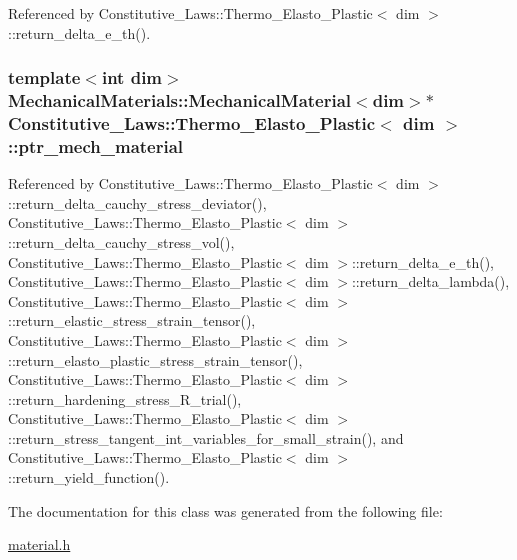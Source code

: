 Referenced by Constitutive\+\_\+\+Laws\+::\+Thermo\+\_\+\+Elasto\+\_\+\+Plastic$<$ dim $>$\+::return\+\_\+delta\+\_\+e\+\_\+th().

\subsubsection[{\texorpdfstring{ptr\+\_\+mech\+\_\+material}{ptr_mech_material}}]{\setlength{\rightskip}{0pt plus 5cm}template$<$int dim$>$ Mechanical\+Materials\+::\+Mechanical\+Material$<$dim$>$$\ast$ {\bf Constitutive\+\_\+\+Laws\+::\+Thermo\+\_\+\+Elasto\+\_\+\+Plastic}$<$ dim $>$\+::ptr\+\_\+mech\+\_\+material\hspace{0.3cm}{\ttfamily [private]}}\hypertarget{classConstitutive__Laws_1_1Thermo__Elasto__Plastic_a5a59fd71829d58859a122fe74628a9e4}{}\label{classConstitutive__Laws_1_1Thermo__Elasto__Plastic_a5a59fd71829d58859a122fe74628a9e4}


Referenced by Constitutive\+\_\+\+Laws\+::\+Thermo\+\_\+\+Elasto\+\_\+\+Plastic$<$ dim $>$\+::return\+\_\+delta\+\_\+cauchy\+\_\+stress\+\_\+deviator(), Constitutive\+\_\+\+Laws\+::\+Thermo\+\_\+\+Elasto\+\_\+\+Plastic$<$ dim $>$\+::return\+\_\+delta\+\_\+cauchy\+\_\+stress\+\_\+vol(), Constitutive\+\_\+\+Laws\+::\+Thermo\+\_\+\+Elasto\+\_\+\+Plastic$<$ dim $>$\+::return\+\_\+delta\+\_\+e\+\_\+th(), Constitutive\+\_\+\+Laws\+::\+Thermo\+\_\+\+Elasto\+\_\+\+Plastic$<$ dim $>$\+::return\+\_\+delta\+\_\+lambda(), Constitutive\+\_\+\+Laws\+::\+Thermo\+\_\+\+Elasto\+\_\+\+Plastic$<$ dim $>$\+::return\+\_\+elastic\+\_\+stress\+\_\+strain\+\_\+tensor(), Constitutive\+\_\+\+Laws\+::\+Thermo\+\_\+\+Elasto\+\_\+\+Plastic$<$ dim $>$\+::return\+\_\+elasto\+\_\+plastic\+\_\+stress\+\_\+strain\+\_\+tensor(), Constitutive\+\_\+\+Laws\+::\+Thermo\+\_\+\+Elasto\+\_\+\+Plastic$<$ dim $>$\+::return\+\_\+hardening\+\_\+stress\+\_\+\+R\+\_\+trial(), Constitutive\+\_\+\+Laws\+::\+Thermo\+\_\+\+Elasto\+\_\+\+Plastic$<$ dim $>$\+::return\+\_\+stress\+\_\+tangent\+\_\+int\+\_\+variables\+\_\+for\+\_\+small\+\_\+strain(), and Constitutive\+\_\+\+Laws\+::\+Thermo\+\_\+\+Elasto\+\_\+\+Plastic$<$ dim $>$\+::return\+\_\+yield\+\_\+function().



The documentation for this class was generated from the following file\+:\begin{DoxyCompactItemize}
\item 
\hyperlink{material_8h}{material.\+h}\end{DoxyCompactItemize}
